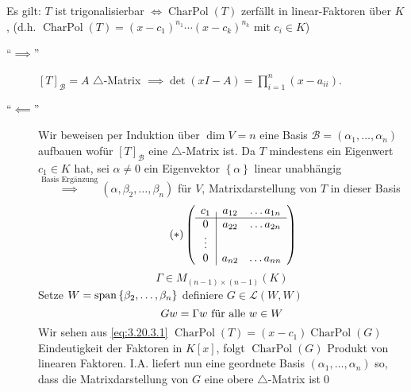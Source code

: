 \begin{subtheorem}
	Es gilt:
	$ T $ ist trigonalisierbar $ \iff \operatorname{Char Pol}(T) $ zerfällt in linear-Faktoren über $ K $,
	(d.h. $ \operatorname{Char Pol}(T) = \left( x - c_1 \right) ^{n_1} \dotsb \left( x - c_k \right) ^{n_k}  $ mit $ c_i \in K $)
\end{subtheorem}
\begin{subproof*}
	\begin{description}
		\item[``$ \implies  $'']
			$ [T]_{\mathcal{B} } = A $ $ \triangle $-Matrix $ \implies \det \left( xI - A \right) = \prod_{i = 1}^{n} \left( x - a_{ii}  \right)   $.
		\item[``$ \impliedby  $'']
			Wir beweisen per Induktion über $ \dim V = n $ eine Basis $ \mathcal{B} = \left( \alpha_1 , \dotsc, \alpha_n \right)  $ aufbauen wofür $ [T]_{\mathcal{B} }  $ eine $ \triangle $-Matrix ist.
			Da $ T $ mindestens ein Eigenwert $ c_1 \in K $ hat, sei $ \alpha \neq 0 $ ein Eigenvektor $ \left\{ \alpha \right\}  $ linear unabhängig $ \overset{\text{Basis Ergänzung} }{\implies } \left( \alpha, \beta_2, \dotsc, \beta_n \right)  $ für $ V $, Matrixdarstellung von $ T $ in dieser Basis
			\begin{equation}
				\label{eq:3.20.3.1}
				\tag{$ * $}
				\left( 
					\begin{array}{c | c c c}
						c_1 & a_{12} & \hdots a_{1n} \\ \hline
						0 & a_{22} & \hdots a_{2n} \\
						\vdots \\
						0 & a_{n2} & \hdots a_{nn} \\
					\end{array}
				\right) 
			\end{equation}
			\[
				\Gamma \in M_{(n - 1) \times (n - 1)} (K)
			\]
			Setze $ W = \operatorname{span} \left\{ \beta_2, \dotsc, \beta_n \right\}  $ definiere $ G \in \mathcal{L} \left( W, W \right)  $ 
			\[
				G w = \Gamma w \text{ für alle $ w \in W $} 
			\]
			Wir sehen aus \eqref{eq:3.20.3.1} $ \operatorname{Char Pol}(T) = (x - c_1) \operatorname{Char Pol}(G) $\\
			Eindeutigkeit der Faktoren in $ K[x] $, folgt $ \operatorname{Char Pol}(G) $ Produkt von linearen Faktoren.
			I.A. liefert nun eine geordnete Basis $ \left( \alpha_1, \dotsc, \alpha_n \right)  $ so, dass die Matrixdarstellung von $ G $ eine obere $ \triangle $-Matrix ist\qed
	\end{description}
\end{subproof*}



